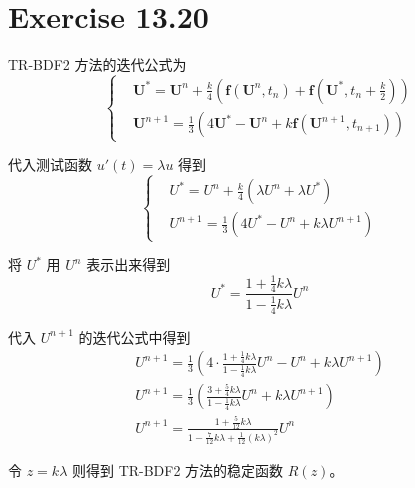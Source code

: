 \documentclass[a4paper]{article}
\begin{document}
\section*{Exercise 13.20}

\par TR-BDF2 方法的迭代公式为
\begin{equation}
    \left\{
        \begin{aligned}
            &\mathbf{U}^* = \mathbf{U}^n + \frac{k}{4}\left(
                \mathbf{f}(\mathbf{U}^n,t_n)+\mathbf{f}\left(\mathbf{U}^*,t_{n}+\frac{k}{2}\right)
            \right) \\
            &\mathbf{U}^{n+1} = \frac{1}{3}\left(
                4\mathbf{U}^* - \mathbf{U}^n + k \mathbf{f}(\mathbf{U}^{n+1},t_{n+1})
            \right)
        \end{aligned}
    \right.
\end{equation}
\par 代入测试函数 $u'(t)=\lambda u$ 得到
\begin{equation}
    \left\{
        \begin{aligned}
            &U^* = U^n + \frac{k}{4}\left(
                \lambda U^n+\lambda U^*
            \right) \\
            &U^{n+1} = \frac{1}{3}\left(
                4U^* - U^n + k \lambda U^{n+1}
            \right)
        \end{aligned}
    \right.
\end{equation}
\par 将 $U^*$ 用 $U^n$ 表示出来得到
\begin{equation}
    U^* = \frac{1+\frac{1}{4}k\lambda}{1-\frac{1}{4}k\lambda}U^n
\end{equation}
\par 代入 $U^{n+1}$ 的迭代公式中得到
\begin{equation}
    \begin{gathered}
        U^{n+1} = \frac{1}{3}\left(
        4\cdot\frac{1+\frac{1}{4}k\lambda}{1-\frac{1}{4}k\lambda}U^n - U^n + k \lambda U^{n+1}
            \right) \\
        U^{n+1} = \frac{1}{3}\left(
        \frac{3+\frac{5}{4}k\lambda}{1-\frac{1}{4}k\lambda}U^n + k \lambda U^{n+1}
            \right) \\
        U^{n+1} = \frac{1+\frac{5}{12}k\lambda}{1-\frac{7}{12}k\lambda+\frac{1}{12}
        (k\lambda)^2}U^n
    \end{gathered}
\end{equation}
\par 令 $z=k\lambda$ 则得到 TR-BDF2 方法的稳定函数 $R(z)$。
\end{document}
